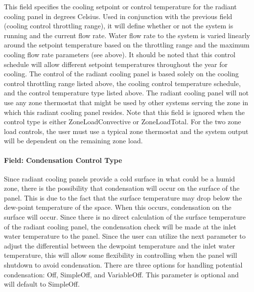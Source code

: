This field specifies the cooling setpoint or control temperature for the radiant cooling panel in degrees Celsius. Used in conjunction with the previous field (cooling control throttling range), it will define whether or not the system is running and the current flow rate. Water flow rate to the system is varied linearly around the setpoint temperature based on the throttling range and the maximum cooling flow rate parameters (see above). It should be noted that this control schedule will allow different setpoint temperatures throughout the year for cooling. The control of the radiant cooling panel is based solely on the cooling control throttling range listed above, the cooling control temperature schedule, and the control temperature type listed above. The radiant cooling panel will not use any zone thermostat that might be used by other systems serving the zone in which this radiant cooling panel resides.  Note that this field is ignored when the control type is either ZoneLoadConvective or ZoneLoadTotal.  For the two zone load controls, the user must use a typical zone thermostat and the system output will be dependent on the remaining zone load.

\paragraph{Field: Condensation Control Type}

Since radiant cooling panels provide a cold surface in what could be a humid zone, there is the possibility that condensation will occur on the surface of the panel. This is due to the fact that the surface temperature may drop below the dew-point temperature of the space. When this occurs, condensation on the surface will occur. Since there is no direct calculation of the surface temperature of the radiant cooling panel, the condensation check will be made at the inlet water temperature to the panel. Since the user can utilize the next parameter to adjust the differential between the dewpoint temperature and the inlet water temperature, this will allow some flexibility in controlling when the panel will shutdown to avoid condensation. There are three options for handling potential condensation: Off, SimpleOff, and VariableOff. This parameter is optional and will default to SimpleOff.

